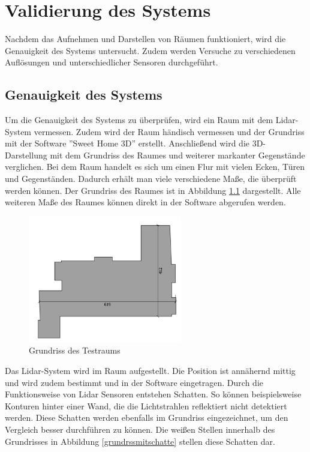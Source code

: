

\chapter{Validierung des Systems}\label{chap:validierung}

Nachdem das Aufnehmen und Darstellen von Räumen funktioniert, wird die Genauigkeit des Systems untersucht. Zudem werden Versuche zu verschiedenen Auflösungen und unterschiedlicher Sensoren durchgeführt.  


\section{Genauigkeit des Systems}

Um die Genauigkeit des Systems zu überprüfen, wird ein Raum mit dem Lidar-System vermessen. Zudem wird der Raum händisch vermessen und der Grundriss mit der Software ''Sweet Home 3D'' erstellt. Anschließend wird die 3D-Darstellung mit dem Grundriss des Raumes und weiterer markanter Gegenstände verglichen.
Bei dem Raum handelt es sich um einen Flur mit vielen Ecken, Türen und Gegenständen. Dadurch erhält man viele verschiedene Maße, die überprüft werden können. Der Grundriss des Raumes ist in Abbildung \ref{grundriss} dargestellt. Alle weiteren Maße des Raumes können direkt in der Software abgerufen werden.

\begin{figure}[H]
	\centering
	\includegraphics[width=0.6\textwidth]{images/Validierung/Grundriss}
	\caption{Grundriss des Testraums}
	\label{grundriss}
\end{figure}


Das Lidar-System wird im Raum aufgestellt. Die Position ist annähernd mittig und wird zudem bestimmt und in der Software eingetragen. Durch die Funktionsweise von Lidar Sensoren entstehen Schatten. So können beispielsweise Konturen hinter einer Wand, die die Lichtstrahlen reflektiert nicht detektiert werden. Diese Schatten werden ebenfalls im Grundriss eingezeichnet, um den Vergleich besser durchführen zu können. Die weißen Stellen innerhalb des Grundrisses in Abbildung \ref{grundrssmitschatte} stellen diese Schatten dar.

